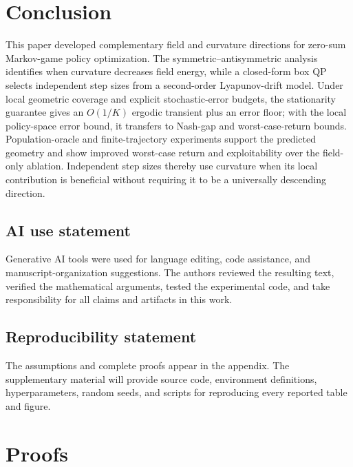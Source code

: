 \documentclass{article}
\theoremstyle{remark}
\begin{document}
\section{Conclusion}
This paper developed complementary field and curvature directions for zero-sum Markov-game policy optimization.
The symmetric--antisymmetric analysis identifies when curvature decreases field energy, while a closed-form box QP selects independent step sizes from a second-order Lyapunov-drift model.
Under local geometric coverage and explicit stochastic-error budgets, the stationarity guarantee gives an $O(1/K)$ ergodic transient plus an error floor; with the local policy-space error bound, it transfers to Nash-gap and worst-case-return bounds.
Population-oracle and finite-trajectory experiments support the predicted geometry and show improved worst-case return and exploitability over the field-only ablation.
Independent step sizes thereby use curvature when its local contribution is beneficial without requiring it to be a universally descending direction.

\subsection*{AI use statement}
Generative AI tools were used for language editing, code assistance, and manuscript-organization suggestions.
The authors reviewed the resulting text, verified the mathematical arguments, tested the experimental code, and take responsibility for all claims and artifacts in this work.

\subsection*{Reproducibility statement}
The assumptions and complete proofs appear in the appendix.
The supplementary material will provide source code, environment definitions, hyperparameters, random seeds, and scripts for reproducing every reported table and figure.




\appendix

\section{Proofs}\label{app:proofs}
\end{document}

